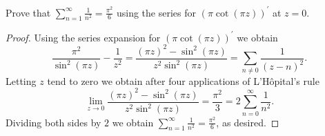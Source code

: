 \documentclass[10pt]{amsart}
\begin{document}
\begin{thm}
  \label{Ex5}
  Prove that ${\displaystyle{\sum_{n=1}^{\infty} \frac{1}{n^2}} = \frac{\pi^2}{6}}$ using the series for $(\pi\cot(\pi z))^{\prime}$ at $z = 0$.
  \begin{proof}
    Using the series expansion for $(\pi\cot(\pi z))^{\prime}$ we obtain
    $$\frac{\pi^2}{\sin^2(\pi z)} - \frac{1}{z^2} = \frac{(\pi z)^2 - \sin^2(\pi z)}{z^2\sin^2(\pi z)} = \sum_{n \neq 0} \frac{1}{(z-n)^2}.$$
    Letting $z$ tend to zero we obtain after four applications of L'H\^opital's rule
    $$\lim_{z\rightarrow 0} \frac{(\pi z)^2 - \sin^2(\pi z)}{z^2\sin^2(\pi z)} = \frac{\pi^2}{3} = 2 \sum_{n=0}^{\infty}\frac{1}{n^2}.$$
    Dividing both sides by $2$ we obtain $\displaystyle{\sum_{n=1}^{\infty} \frac{1}{n^2} = \frac{\pi^2}{6}}$, as desired.
  \end{proof}
\end{thm}
\end{document}
